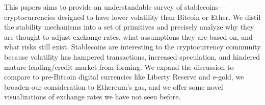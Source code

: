 
This papers aims to provide an understandable survey of stablecoins---cryptocurrencies designed to have lower volatility than Bitcoin or Ether. We distil the stability mechanisms into a set of primitives and precisely analyze why they are thought to adjust exchange rates, what assumptions they are based on, and what risks still exist. Stablecoins are interesting to the cryptocurrency community because volatility has hampered transactions, increased speculation, and hindered mature lending/credit market from forming. We expand the discussion to compare to pre-Bitcoin digital currencies like Liberty Reserve and e-gold, we broaden our consideration to Ethereum's gas, and we offer some novel visualizations of exchange rates we have not seen before.

